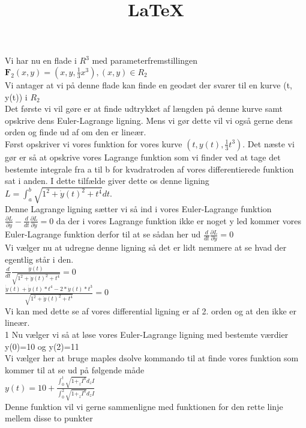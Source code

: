 \documentclass[12pt]{article}
\title{LaTeX}
\date{}
\begin{document}
  \maketitle
Vi har nu en flade i $R^3$ med parameterfremstillingen \\
$\textbf{F}_{2}(x,y)=(x, y, \frac{1}{3}x^3), (x,y) \in R_{2} $\\
Vi antager at vi på denne flade kan finde en geodæt  der svarer til en kurve (t, y(t)) i $R_{2}$ \\
Det første vi vil gøre er at finde udtrykket af længden på denne kurve samt opskrive dens Euler-Lagrange ligning. Mens vi gør dette vil vi også gerne dens orden og finde ud af om den er lineær. \\
Først opskriver vi vores funktion for vores kurve $(t,y(t), \frac{1}{3} t^3)$. Det næste vi gør er så at opskrive vores Lagrange funktion som vi finder ved at tage det bestemte integrale fra a til b for kvadratroden af vores differentierede funktion sat i anden. I dette tilfælde giver dette os denne ligning \\
$L=\int_{a}^{b} \sqrt{1^2+ \dot{y}(t)^2+t^4}dt. $\\
Denne Lagrange ligning sætter vi så ind i vores Euler-Lagrange funktion $ \frac{ \partial L}{ \partial y}-  \frac{d}{dt} \frac{ \partial L}{ \partial \dot{y}}=0$ da der i vores Lagrange funktion ikke er noget y led kommer vores Euler-Lagrange funktion derfor til at se sådan her ud $ \frac{d}{dt} \frac{ \partial L}{ \partial \dot{y}}=0 $\\
Vi vælger nu at udregne denne ligning så det er lidt nemmere at se hvad der egentlig står i den. \\
$ \frac{d}{dt} \frac{ \dot{y}(t)}{ \sqrt{1^2+ \dot{y}(t)^2+t^4}}=0  $\\
$ \frac{ \dot{ \dot{y}}(t)+ \dot{ \dot{y}}(t)*t^4-2* \dot{y}(t)*t^3}{\sqrt{1^2+ \dot{y}(t)^2+t^4}}=0 $\\
Vi kan med dette se af vores differential ligning er af 2. orden og at den ikke er lineær. \\1
Nu vælger vi så at løse vores Euler-Lagrange ligning med bestemte værdier y(0)=10 og y(2)=11 \\
Vi vælger her at bruge maples dsolve kommando til at finde vores funktion som kommer til at se ud på følgende måde \\
$y(t)=10+ \frac{\int_{0}^{t}\sqrt{1+_zI^4}d_zI}{\int_{0}^{2}\sqrt{1+_zI^4}d_zI} $ \\
Denne funktion vil vi gerne sammenligne med funktionen for den rette linje mellem disse to punkter \\
\end{document}
